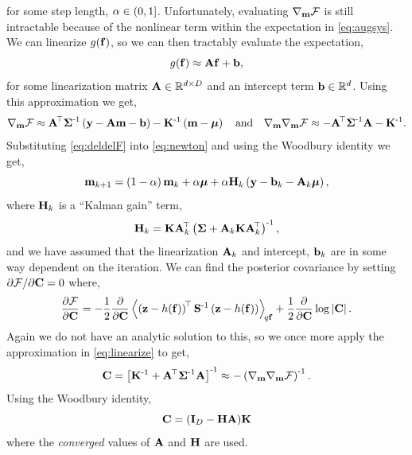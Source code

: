 \documentclass{article} %
\begin{document}
for some step length, $\step \in (0, 1]$. Unfortunately, evaluating
$\nabla_\pomean\Fengy$ is still intractable because of the nonlinear term
within the expectation in \eqref{eq:augsys}. We can linearize
$\nonlin{\lstate}$, so we can then tractably evaluate the expectation,
\begin{equation}
    \nonlin{\lstate} \approx \Linmat\lstate + \intcpt,
    \label{eq:linearize}
\end{equation}
for some linearization matrix $\Linmat \in \real{d \times D}$ and an intercept
term $\intcpt \in \real{d}$. Using this approximation we get,
\begin{equation}
    \nabla_\pomean \Fengy
        \approx \Linmat\transpose\lcov\inv\brac{\obs - \Linmat\pomean 
            - \intcpt} - \prcov\inv\brac{\pomean - \prmean}
    \quad \text{and} \quad
    \nabla_\pomean \nabla_\pomean \Fengy
        \approx - \Linmat\transpose\lcov\inv\Linmat - \prcov\inv.
        \label{eq:deldelF}
\end{equation}
Substituting \eqref{eq:deldelF} into \eqref{eq:newton} and using the Woodbury
identity we get,
\begin{equation}
    \pomean_{k+1} = \brac{1-\step}\pomean_k + \step\prmean 
        + \step\Kgain_k\brac{\obs - \intcpt_k - \Linmat_k\prmean},
    \label{eq:pomean}
\end{equation}
where $\Kgain_k$ is a ``Kalman gain'' term,
\begin{equation}
    \Kgain_k = \prcov\Linmat_k\transpose\brac{\lcov +
        \Linmat_k\prcov\Linmat_k\transpose}\inv,
    \label{eq:kgain}
\end{equation}
and we have assumed that the linearization $\Linmat_k$ and intercept,
$\intcpt_k$ are in some way dependent on the iteration. We can find the 
posterior covariance by setting $\partial\Fengy/\partial\pocov = 0$ where,
\begin{equation}
    \frac{\partial\Fengy}{\partial\pocov} = -\frac{1}{2} 
        \frac{\partial}{\partial\pocov}
        \expec{q\lstate}{
            \brac{\augobs - \augnonlin{\lstate}}\transpose\augcov\inv
            \brac{\augobs - \augnonlin{\lstate}}
    } 
    + \frac{1}{2} \frac{\partial}{\partial\pocov} \log \deter{\pocov}.
\end{equation}
Again we do not have an analytic solution to this, so we once more apply the 
approximation in \eqref{eq:linearize} to get,
\begin{equation}
    \pocov = \sbrac{\prcov\inv + \Linmat\transpose\lcov\inv\Linmat}\inv
        \approx - \brac{\nabla_\pomean \nabla_\pomean \Fengy}\inv.
    \label{eq:pocovi}
\end{equation}
Using the Woodbury identity,
\begin{equation}
    \pocov = \brac{\ident{D} - \Kgain\Linmat}\!\prcov
    \label{eq:pocov}
\end{equation}
where the \emph{converged} values of $\Linmat$ and $\Kgain$ are used.
\end{document}
